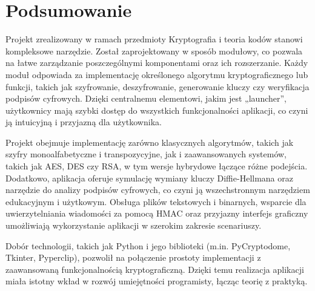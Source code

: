 \documentclass[12pt,a4paper]{article}
\begin{document}
\newpage
\section{Podsumowanie}
\noindent Projekt zrealizowany w ramach przedmioty Kryptografia i teoria kodów stanowi kompleksowe narzędzie. Został zaprojektowany w sposób modułowy, co pozwala na łatwe zarządzanie poszczególnymi komponentami oraz ich rozszerzanie. Każdy moduł odpowiada za implementację określonego algorytmu kryptograficznego lub funkcji, takich jak szyfrowanie, deszyfrowanie, generowanie kluczy czy weryfikacja podpisów cyfrowych. Dzięki centralnemu elementowi, jakim jest „launcher”, użytkownicy mają szybki dostęp do wszystkich funkcjonalności aplikacji, co czyni ją intuicyjną i przyjazną dla użytkownika.\newline

\noindent Projekt obejmuje implementację zarówno klasycznych algorytmów, takich jak szyfry monoalfabetyczne i transpozycyjne, jak i zaawansowanych systemów, takich jak AES, DES czy RSA, w tym wersje hybrydowe łączące różne podejścia. Dodatkowo, aplikacja oferuje symulację wymiany kluczy Diffie-Hellmana oraz narzędzie do analizy podpisów cyfrowych, co czyni ją wszechstronnym narzędziem edukacyjnym i użytkowym. Obsługa plików tekstowych i binarnych, wsparcie dla uwierzytelniania wiadomości za pomocą HMAC oraz przyjazny interfejs graficzny umożliwiają wykorzystanie aplikacji w szerokim zakresie scenariuszy.\newline

\noindent Dobór technologii, takich jak Python i jego biblioteki (m.in. PyCryptodome, Tkinter, Pyperclip), pozwolił na połączenie prostoty implementacji z zaawansowaną funkcjonalnością kryptograficzną. Dzięki temu realizacja aplikacji miała istotny wkład w rozwój umiejętności programisty, łącząc teorię z praktyką.
\end{document}
